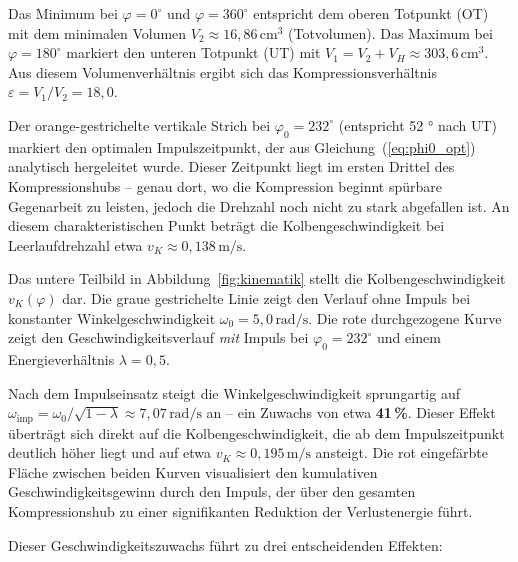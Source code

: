 ﻿\documentclass[a4paper,12pt]{article}
\begin{document}
Das Minimum bei $\varphi = 0^\circ$ und $\varphi = 360^\circ$ entspricht
dem oberen Totpunkt (OT) mit dem minimalen Volumen $V_2 \approx 16{,}86\,\text{cm}^3$
(Totvolumen). Das Maximum bei $\varphi = 180^\circ$ markiert den unteren
Totpunkt (UT) mit $V_1 = V_2 + V_H \approx 303{,}6\,\text{cm}^3$. Aus diesem
Volumenverhältnis ergibt sich das Kompressionsverhältnis $\varepsilon = V_1/V_2 = 18{,}0$.

Der orange-gestrichelte vertikale Strich bei $\varphi_0 = 232^\circ$
(entspricht 52 ° nach UT) markiert den optimalen Impulszeitpunkt, der aus
Gleichung~(\ref{eq:phi0_opt}) analytisch hergeleitet wurde. Dieser Zeitpunkt
liegt im ersten Drittel des Kompressionshubs -- genau dort, wo die Kompression
beginnt spürbare Gegenarbeit zu leisten, jedoch die Drehzahl noch nicht
zu stark abgefallen ist. An diesem charakteristischen Punkt beträgt die
Kolbengeschwindigkeit bei Leerlaufdrehzahl etwa $v_K \approx 0{,}138\,\text{m/s}$.

Das untere Teilbild in Abbildung~\ref{fig:kinematik} stellt die Kolbengeschwindigkeit
$v_K(\varphi)$ dar. Die graue gestrichelte Linie zeigt den Verlauf ohne Impuls
bei konstanter Winkelgeschwindigkeit $\omega_0 = 5{,}0\,\text{rad/s}$. Die rote
durchgezogene Kurve zeigt den Geschwindigkeitsverlauf \textit{mit} Impuls bei
$\varphi_0 = 232^\circ$ und einem Energieverhältnis $\lambda = 0{,}5$.

Nach dem Impulseinsatz steigt die Winkelgeschwindigkeit sprungartig auf
$\omega_\text{imp} = \omega_0 / \sqrt{1-\lambda} \approx 7{,}07\,\text{rad/s}$
an -- ein Zuwachs von etwa \textbf{41\,\%}. Dieser Effekt überträgt sich direkt auf die
Kolbengeschwindigkeit, die ab dem Impulszeitpunkt deutlich höher liegt und
auf etwa $v_K \approx 0{,}195\,\text{m/s}$ ansteigt. Die rot eingefärbte Fläche
zwischen beiden Kurven visualisiert den kumulativen Geschwindigkeitsgewinn durch
den Impuls, der über den gesamten Kompressionshub zu einer signifikanten
Reduktion der Verlustenergie führt.

Dieser Geschwindigkeitszuwachs führt zu drei entscheidenden Effekten:
\end{document}
